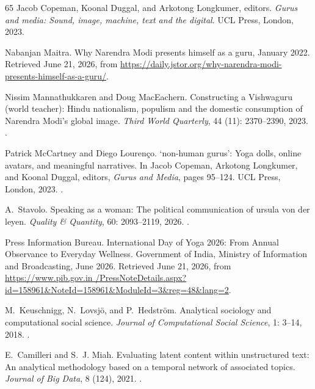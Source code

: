 \documentclass[11pt]{article}
\begin{document}
\begin{thebibliography}{65}
Jacob Copeman, Koonal Duggal, and Arkotong Longkumer, editors.
\newblock \emph{Gurus and media: Sound, image, machine, text and the digital}.
\newblock UCL Press, London, 2023.

Nabanjan Maitra.
\newblock Why {Narendra} {Modi} presents himself as a guru, January 2022.
\newblock Retrieved June 21, 2026, from
  \url{https://daily.jstor.org/why-narendra-modi-presents-himself-as-a-guru/}.

Nissim Mannathukkaren and Doug MacEachern.
\newblock Constructing a {Vishwaguru} (world teacher): {Hindu} nationalism,
  populism and the domestic consumption of {Narendra} {Modi’s} global image.
\newblock \emph{Third World Quarterly}, 44 (11): 2370--2390,
  2023.
\newblock {}.

Patrick McCartney and Diego Louren{\c{c}}o.
\newblock `non-human gurus': {Yoga} dolls, online avatars, and meaningful
  narratives.
\newblock In Jacob Copeman, Arkotong Longkumer, and Koonal Duggal, editors,
  \emph{Gurus and Media}, pages 95--124. UCL Press, London, 2023.
\newblock {}.

A.~Stavolo.
\newblock Speaking as a woman: The political communication of ursula von der
  leyen.
\newblock \emph{Quality \& Quantity}, 60: 2093--2119, 2026.
\newblock {}.

{Press Information Bureau}.
\newblock International {Day} of {Yoga} 2026: {From} {Annual} {Observance} to
  {Everyday} {Wellness}.
\newblock Government of India, Ministry of Information and Broadcasting, June
  2026.
\newblock Retrieved June 21, 2026, from \url{https://www.pib.gov.in
  /PressNoteDetails.aspx?id=158961&NoteId=158961&ModuleId=3&reg=48&lang=2}.

M.~Keuschnigg, N.~Lovsj{\"o}, and P.~Hedstr{\"o}m.
\newblock Analytical sociology and computational social science.
\newblock \emph{Journal of Computational Social Science}, 1: 3--14,
  2018.
\newblock {}.

E.~Camilleri and S.~J. Miah.
\newblock Evaluating latent content within unstructured text: An analytical
  methodology based on a temporal network of associated topics.
\newblock \emph{Journal of Big Data}, 8 (124), 2021.
\newblock {}.


\end{thebibliography}
\end{document}
